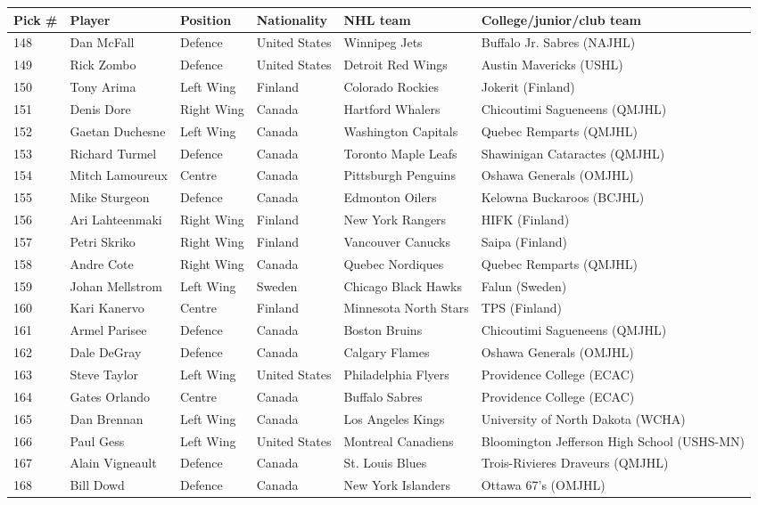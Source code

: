 \documentclass{article}
\begin{document}
\begin{tabular}{llllll}
\toprule
Pick \# & Player & Position & Nationality & NHL team & College/junior/club team \\
\midrule
148 & Dan McFall & Defence & United States & Winnipeg Jets & Buffalo Jr. Sabres (NAJHL) \\
149 & Rick Zombo & Defence & United States & Detroit Red Wings & Austin Mavericks (USHL) \\
150 & Tony Arima & Left Wing & Finland & Colorado Rockies & Jokerit (Finland) \\
151 & Denis Dore & Right Wing & Canada & Hartford Whalers & Chicoutimi Sagueneens (QMJHL) \\
152 & Gaetan Duchesne & Left Wing & Canada & Washington Capitals & Quebec Remparts (QMJHL) \\
153 & Richard Turmel & Defence & Canada & Toronto Maple Leafs & Shawinigan Cataractes (QMJHL) \\
154 & Mitch Lamoureux & Centre & Canada & Pittsburgh Penguins & Oshawa Generals (OMJHL) \\
155 & Mike Sturgeon & Defence & Canada & Edmonton Oilers & Kelowna Buckaroos (BCJHL) \\
156 & Ari Lahteenmaki & Right Wing & Finland & New York Rangers & HIFK (Finland) \\
157 & Petri Skriko & Right Wing & Finland & Vancouver Canucks & Saipa (Finland) \\
158 & Andre Cote & Right Wing & Canada & Quebec Nordiques & Quebec Remparts (QMJHL) \\
159 & Johan Mellstrom & Left Wing & Sweden & Chicago Black Hawks & Falun (Sweden) \\
160 & Kari Kanervo & Centre & Finland & Minnesota North Stars & TPS (Finland) \\
161 & Armel Parisee & Defence & Canada & Boston Bruins & Chicoutimi Sagueneens (QMJHL) \\
162 & Dale DeGray & Defence & Canada & Calgary Flames & Oshawa Generals (OMJHL) \\
163 & Steve Taylor & Left Wing & United States & Philadelphia Flyers & Providence College (ECAC) \\
164 & Gates Orlando & Centre & Canada & Buffalo Sabres & Providence College (ECAC) \\
165 & Dan Brennan & Left Wing & Canada & Los Angeles Kings & University of North Dakota (WCHA) \\
166 & Paul Gess & Left Wing & United States & Montreal Canadiens & Bloomington Jefferson High School (USHS-MN) \\
167 & Alain Vigneault & Defence & Canada & St. Louis Blues & Trois-Rivieres Draveurs (QMJHL) \\
168 & Bill Dowd & Defence & Canada & New York Islanders & Ottawa 67's (OMJHL) \\
\bottomrule
\end{tabular}
\end{document}
